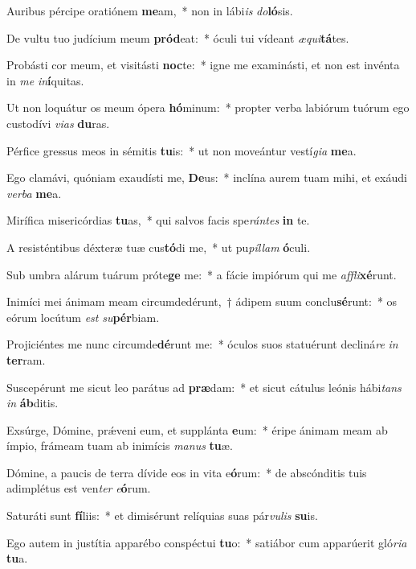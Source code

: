 \item Auribus pércipe oratiónem \textbf{me}am,~* non in lábi\textit{is} \textit{do}\textbf{ló}sis.
\item De vultu tuo judícium meum \textbf{pród}eat:~* óculi tui vídeant \textit{æ}\textit{qui}\textbf{tá}tes.
\item Probásti cor meum, et visitásti \textbf{noc}te:~* igne me examinásti, et non est invénta in \textit{me} \textit{in}\textbf{í}quitas.
\item Ut non loquátur os meum ópera \textbf{hó}minum:~* propter verba labiórum tuórum ego custodívi \textit{vi}\textit{as} \textbf{du}ras.
\item Pérfice gressus meos in sémitis \textbf{tu}is:~* ut non moveántur vestí\textit{gi}\textit{a} \textbf{me}a.
\item Ego clamávi, quóniam exaudísti me, \textbf{De}us:~* inclína aurem tuam mihi, et exáudi \textit{ver}\textit{ba} \textbf{me}a.
\item Mirífica misericórdias \textbf{tu}as,~* qui salvos facis spe\textit{rán}\textit{tes} \textbf{in} te.
\item A resisténtibus déxteræ tuæ cus\textbf{tó}di me,~* ut pu\textit{píl}\textit{lam} \textbf{ó}culi.
\item Sub umbra alárum tuárum próte\textbf{ge} me:~* a fácie impiórum qui me \textit{af}\textit{fli}\textbf{xé}runt.
\item Inimíci mei ánimam meam circumdedérunt,~† ádipem suum conclu\textbf{sé}runt:~* os eórum locútum \textit{est} \textit{su}\textbf{pér}biam.
\item Projiciéntes me nunc circumde\textbf{dé}runt me:~* óculos suos statuérunt decliná\textit{re} \textit{in} \textbf{ter}ram.
\item Suscepérunt me sicut leo parátus ad \textbf{præ}dam:~* et sicut cátulus leónis hábi\textit{tans} \textit{in} \textbf{áb}ditis.
\item Exsúrge, Dómine, prǽveni eum, et supplánta \textbf{e}um:~* éripe ánimam meam ab ímpio, frámeam tuam ab inimícis \textit{ma}\textit{nus} \textbf{tu}æ.
\item Dómine, a paucis de terra dívide eos in vita e\textbf{ó}rum:~* de abscónditis tuis adimplétus est ven\textit{ter} \textit{e}\textbf{ó}rum.
\item Saturáti sunt \textbf{fí}liis:~* et dimisérunt relíquias suas pár\textit{vu}\textit{lis} \textbf{su}is.
\item Ego autem in justítia apparébo conspéctui \textbf{tu}o:~* satiábor cum apparúerit gló\textit{ri}\textit{a} \textbf{tu}a.

